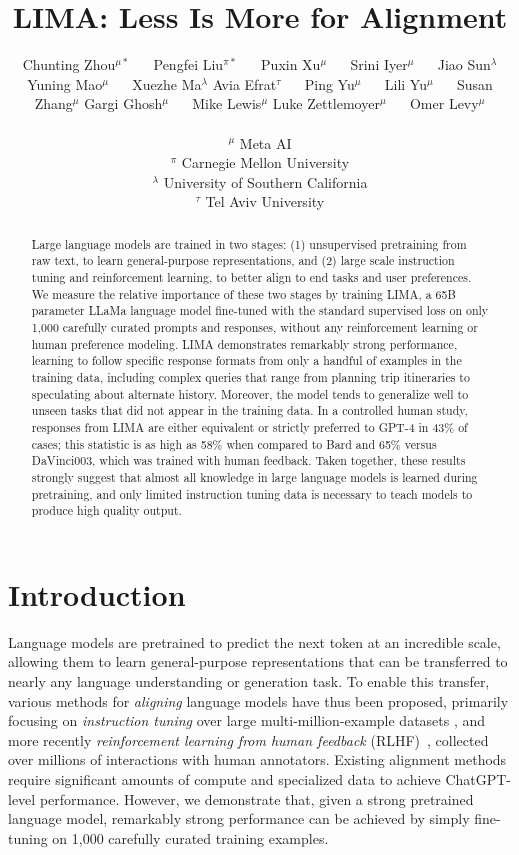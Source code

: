 \documentclass{article}
\title{LIMA: Less Is More for Alignment}
\author{
Chunting Zhou$^{\mu*}$ $\quad$ Pengfei Liu$^{\pi*}$ $\quad$ Puxin Xu$^{\mu}$ $\quad$ Srini Iyer$^{\mu}$ $\quad$ Jiao Sun$^{\lambda}$ 
\And Yuning Mao$^{\mu}$ $\quad$ Xuezhe Ma$^{\lambda}$ \quad Avia Efrat$^{\tau}$ $\quad$ Ping Yu$^{\mu}$ $\quad$ Lili Yu$^{\mu}$ $\quad$ Susan Zhang$^{\mu}$
\And Gargi Ghosh$^{\mu}$ $\quad$ Mike Lewis$^{\mu}$ \quad Luke Zettlemoyer$^{\mu}$ $\quad$ Omer Levy$^{\mu}$ \\\\
$^{\mu}$ Meta AI\\
$^{\pi}$ Carnegie Mellon University\\
$^{\lambda}$ University of Southern California\\
$^{\tau}$ Tel Aviv University}
\begin{document}
\maketitle

\begin{abstract}
Large language models are trained in two stages: (1) unsupervised pretraining from raw text, to learn general-purpose representations, and (2) large scale instruction tuning and reinforcement learning, to better align to end tasks and user preferences. 
We measure the relative importance of these two stages by training LIMA, a 65B parameter LLaMa language model fine-tuned with the standard supervised loss on only 1,000 carefully curated prompts and responses, without any reinforcement learning or human preference modeling.
LIMA demonstrates remarkably strong performance, learning to follow specific response formats from only a handful of examples in the training data, including complex queries that range from planning trip itineraries to speculating about alternate history.
Moreover, the model tends to generalize well to unseen tasks that did not appear in the training data.
In a controlled human study, responses from LIMA are either equivalent or strictly preferred to GPT-4 in 43\% of cases; this statistic is as high as 58\% when compared to Bard and 65\% versus DaVinci003, which was trained with human feedback.
Taken together, these results strongly suggest that almost all knowledge in large language models is learned during pretraining, and only limited instruction tuning data is necessary to teach models to produce high quality output.
\end{abstract}

\section{Introduction}

Language models are pretrained to predict the next token at an incredible scale, allowing them to learn general-purpose representations that can be transferred to nearly any language understanding or generation task. 
To enable this transfer, various methods for \textit{aligning} language models have thus been proposed, primarily focusing on \textit{instruction tuning} \citep{mishra2021natural, weifinetuned, sanh2022multitask} over large multi-million-example datasets \citep{chung2022scaling, beeching2023stackllama, openassistant}, and more recently \textit{reinforcement learning from human feedback} (RLHF)~\citep{bai2022training, ouyang2022training}, collected over millions of interactions with human annotators.
Existing alignment methods require significant amounts of compute and specialized data to achieve ChatGPT-level performance.
However, we demonstrate that, given a strong pretrained language model, remarkably strong performance can be achieved by simply fine-tuning on 1,000 carefully curated training examples.
\end{document}
